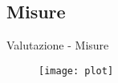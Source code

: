 \subsection{Misure}
\begin{frame}{Valutazione - Misure}
	\begin{figure}
	\texttt{[image: plot]}
	\end{figure}
	
\end{frame}